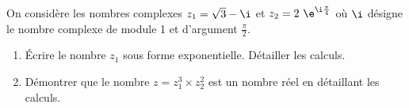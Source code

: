\medskip

On considère les nombres complexes $z_1 = \sqrt{3} - \i$ et $z_2 = 2~\e^{\i\frac{\pi}{4}}$ où $\i$ désigne le nombre
complexe de module 1 et d'argument $\frac{\pi}{2}$.
\begin{enumerate}
\item  Écrire le nombre $z_1$ sous forme exponentielle. Détailler les calculs.
\item Démontrer que le nombre $z = z_1^3\times z_2^2$ est un nombre réel en détaillant les calculs.
\end{enumerate}

\bigskip
